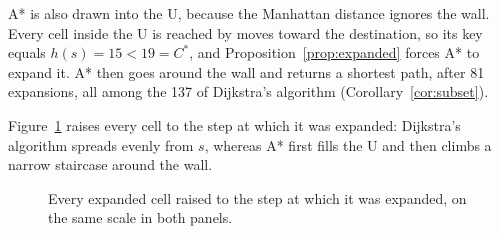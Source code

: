 A* is also drawn into the U, because the Manhattan distance ignores the wall.
Every cell inside the U is reached by moves toward the destination, so its key
equals $h(s) = 15 < 19 = C^{*}$, and Proposition~\ref{prop:expanded} forces A*
to expand it. A* then goes around the wall and returns a shortest path, after
81 expansions, all among the 137 of Dijkstra's algorithm
(Corollary~\ref{cor:subset}).

Figure~\ref{fig:timeview} raises every cell to the step at which it was
expanded: Dijkstra's algorithm spreads evenly from $s$, whereas A* first fills
the U and then climbs a narrow staircase around the wall.

\begin{figure}[htbp]
  \centering
  
  \caption{Every expanded cell raised to the step at which it was expanded, on
    the same scale in both panels.}\label{fig:timeview}
\end{figure}
